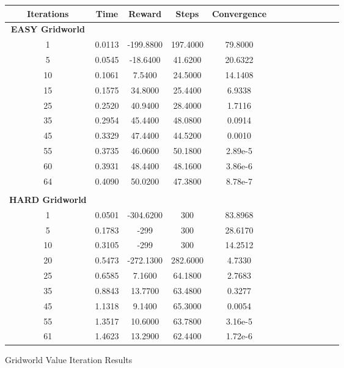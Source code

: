 \documentclass[h]{article}
\begin{document}
 
 \begin{figure}[H] 
\centering
\begin{tabular}{ | c | c  | c | c | c | c | c | c| c| c| c| c| c | } 
\hline
\textbf{Iterations} & \textbf{Time} & \textbf{Reward} & \textbf{Steps} & \textbf{Convergence}   \\
\hline
\textbf{EASY Gridworld} \\ \hline
1 & 0.0113 & -199.8800 & 197.4000 & 79.8000 \\ \hline
5 & 0.0545 & -18.6400 & 41.6200 & 20.6322 \\ \hline
10 & 0.1061 & 7.5400 & 24.5000 & 14.1408 \\ \hline
15 & 0.1575 & 34.8000 & 25.4400 & 6.9338 \\ \hline
25 & 0.2520 & 40.9400 & 28.4000 & 1.7116 \\ \hline
35 & 0.2954 & 45.4400 & 48.0800 & 0.0914 \\ \hline
45 & 0.3329 & 47.4400 & 44.5200 & 0.0010 \\ \hline
55 & 0.3735 & 46.0600 & 50.1800 & 2.89e-5 \\ \hline
60 & 0.3931 & 48.4400 & 48.1600 & 3.86e-6 \\ \hline
64 & 0.4090 & 50.0200 & 47.3800 & 8.78e-7 \\ \hline
\\
\textbf{HARD Gridworld} \\ \hline
1 & 0.0501 & -304.6200 & 300 & 83.8968 \\ \hline
5 & 0.1783 & -299 & 300 & 28.6170 \\ \hline
10 & 0.3105 & -299 & 300 & 14.2512 \\ \hline
20 & 0.5473 & -272.1300 & 282.6000 & 4.7330 \\ \hline
25 & 0.6585 & 7.1600 & 64.1800 & 2.7683 \\ \hline
35 & 0.8843 & 13.7700 & 63.4800 & 0.3277 \\ \hline
45 & 1.1318 & 9.1400 & 65.3000 & 0.0054 \\ \hline
55 & 1.3517 & 10.6000 & 63.7800 & 3.16e-5 \\ \hline
61 & 1.4623 & 13.2900 & 62.4400 & 1.72e-6 \\ \hline

\end{tabular}
\caption*{Gridworld Value Iteration Results} 
\end{figure}
 
\end{document}
